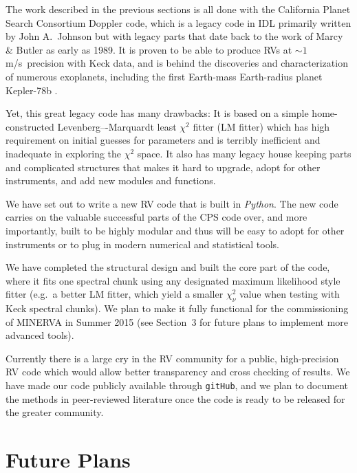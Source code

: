 \documentclass[12pt]{article}
\def\mps{m/s}
\begin{document}
The work described in the previous sections is all done with the
California Planet Search Consortium Doppler code, which is a legacy
code in IDL primarily written by John A.\ Johnson but with legacy
parts that date back to the work of Marcy \& Butler as early as
1989. It is proven to be able to produce RVs at $\sim 1$
\mps\ precision with Keck data, and is behind the discoveries and
characterization of numerous exoplanets, including the first
Earth-mass Earth-radius planet Kepler-78b \citep{howard2013,pepe2013}.

Yet, this great legacy code has many drawbacks: It is based on a
simple home-constructed Levenberg–-Marquardt least $\chi^2$ fitter
(LM fitter) which has high requirement on initial guesses for
parameters and is terribly inefficient and inadequate in exploring the
$\chi^2$ space. It also has many legacy house keeping parts and
complicated structures that makes it hard to upgrade, adopt for other
instruments, and add new modules and functions.

We have set out to write a new RV code that is built in {\it Python}.
The new code carries on the valuable successful parts of the CPS code
over, and more importantly, built to be highly modular and thus will
be easy to adopt for other instruments or to plug in modern
numerical and statistical tools.

We have completed the structural design and built the core part of the
code, where it fits one spectral chunk using any designated maximum
likelihood style fitter (e.g.\ a better LM fitter, which yield a
smaller $\chi^2_\nu$ value when testing with Keck spectral chunks). We
plan to make it fully functional for the commissioning of MINERVA in
Summer 2015 (see Section~3 for future plans to implement more
advanced tools).

Currently there is a large cry in the RV community for a public,
high-precision RV code which would allow better transparency and cross
checking of results. We have made our code publicly available through
{\tt gitHub}, and we plan to document the methods in peer-reviewed
literature once the code is ready to be released for the greater
community.


\vspace{-10pt}
\section{Future Plans}
\vspace{-5pt}
\end{document}
